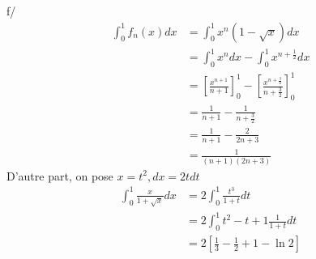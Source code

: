 \documentclass{article}
\begin{document}
\noindent 
f/ 
\begin{align*}
  \int_{0}^{1}f_{n}(x)dx &= \int_{0}^{1}x^{n}(1-\sqrt{x})dx\\ 
                         &= \int_{0}^{1}x^{n}dx - \int_{0}^{1}x^{n+\frac{1}{2}}dx\\
                         &= [\frac{x^{n+1}}{n+1}]^{1}_{0}- [\frac{x^{n+\frac{3}{2}}}{n+\frac{3}{2}}]_{0}^{1}\\ 
                         &= \frac{1}{n+1}-\frac{1}{n+\frac{3}{2}}\\
                         &= \frac{1}{n+1}-\frac{2}{2n+3}\\
                         &= \frac{1}{(n+1)(2n+3)}
\end{align*}
D'autre part, on pose \(x=t^{2}, dx = 2t dt\)
\begin{align*}
  \int_{0}^{1}\frac{x}{1+\sqrt{x}}dx &= 2 \int_{0}^{1}\frac{t^{3}}{1+t}dt \\
                                     &= 2 \int_{0}^{1} t^{2} - t + 1 \frac{1}{1+t}dt \\
                                     &= 2[\frac{1}{3}-\frac{1}{2}+1 - \ln 2]
\end{align*}
\end{document}
